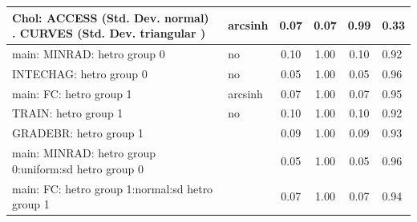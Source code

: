 \begin{table}
\begin{center}
\begin{tabular}{|l|l|c|c|c|l|}
			\hline
			 Chol: ACCESS (Std. Dev. normal) . CURVES (Std. Dev.   triangular ) & arcsinh & 0.07 & 0.07 & 0.99 & 0.33 \\
			\hline
			main: MINRAD: hetro group 0 & no & 0.10 & 1.00 & 0.10 & 0.92 \\
			\hline
			INTECHAG: hetro group 0 & no & 0.05 & 1.00 & 0.05 & 0.96 \\
			\hline
			main: FC: hetro group 1 & arcsinh & 0.07 & 1.00 & 0.07 & 0.95 \\
			\hline
			TRAIN: hetro group 1 & no & 0.10 & 1.00 & 0.10 & 0.92 \\
			\hline
			GRADEBR: hetro group 1 &  & 0.09 & 1.00 & 0.09 & 0.93 \\
			\hline
			main: MINRAD: hetro group 0:uniform:sd  hetro group 0 &  & 0.05 & 1.00 & 0.05 & 0.96 \\
			\hline
			main: FC: hetro group 1:normal:sd  hetro group 1 &  & 0.07 & 1.00 & 0.07 & 0.94 \\
			\hline
		\end{tabular}
	\end{center}
\end{table}
